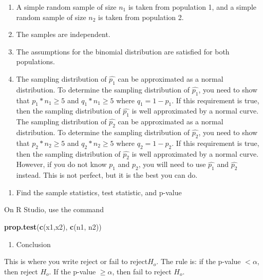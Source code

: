 \documentclass[
]{book}
\newenvironment{Shaded}{\begin{snugshade}}{\end{snugshade}}
\newcommand{\KeywordTok}[1]{\textcolor[rgb]{0.13,0.29,0.53}{\textbf{#1}}}
\newcommand{\NormalTok}[1]{#1}
\providecommand{\tightlist}{%
  \setlength{\itemsep}{0pt}\setlength{\parskip}{0pt}}
\begin{document}
\begin{enumerate}
\def\labelenumi{\alph{enumi}.}
\item
  A simple random sample of size \(n_1\) is taken from population 1, and a simple random sample of size \(n_2\) is taken from population 2.
\item
  The samples are independent.
\item
  The assumptions for the binomial distribution are satisfied for both populations.
\item
  The sampling distribution of \(\hat{p_1}\) can be approximated as a normal distribution. To determine the sampling distribution of \(\hat{p_1}\), you need to show that \(p_1*n_1\ge5\) and \(q_1*n_1\ge5\) where \(q_1=1-p_1\). If this requirement is true, then the sampling distribution of \(\hat{p_1}\) is well approximated by a normal curve. The sampling distribution of \(\hat{p_2}\) can be approximated as a normal distribution. To determine the sampling distribution of \(\hat{p_2}\), you need to show that \(p_2*n_2\ge 5\) and \(q_2*n_2\ge 5\) where \(q_2=1-p_2\). If this requirement is true, then the sampling distribution of \(\hat{p_2}\) is well approximated by a normal curve. However, if you do not know \(p_1\) and \(p_2\), you will need to use \(\hat{p_1}\) and \(\hat{p_2}\) instead. This is not perfect, but it is the best you can do.
\end{enumerate}

\begin{enumerate}
\def\labelenumi{\arabic{enumi}.}
\setcounter{enumi}{3}
\tightlist
\item
  Find the sample statistics, test statistic, and p-value
\end{enumerate}

On R Studio, use the command

\begin{Shaded}
\begin{Highlighting}[]
\KeywordTok{prop.test}\NormalTok{(}\KeywordTok{c}\NormalTok{(x1,x2), }\KeywordTok{c}\NormalTok{(n1, n2))}
\end{Highlighting}
\end{Shaded}

\begin{enumerate}
\def\labelenumi{\arabic{enumi}.}
\setcounter{enumi}{4}
\tightlist
\item
  Conclusion
\end{enumerate}

This is where you write reject or fail to reject\(H_o\). The rule is: if the p-value \(<\alpha\), then reject \(H_o\). If the p-value \(\ge \alpha\), then fail to reject \(H_o\).
\end{document}
